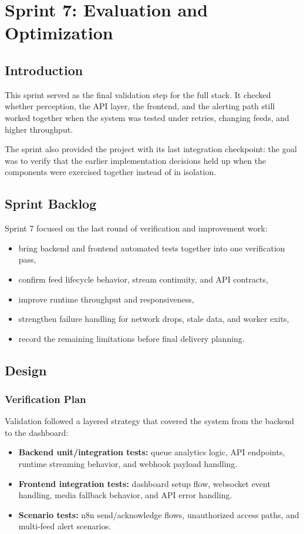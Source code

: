 \chapter{Sprint 7: Evaluation and Optimization}
\chaptertoc

\clearpage

\section{Introduction}
This sprint served as the final validation step for the full stack. It checked whether perception, the API layer, the frontend, and the alerting path still worked together when the system was tested under retries, changing feeds, and higher throughput.

The sprint also provided the project with its last integration checkpoint: the goal was to verify that the earlier implementation decisions held up when the components were exercised together instead of in isolation.

\section{Sprint Backlog}
Sprint 7 focused on the last round of verification and improvement work:
\begin{itemize}
	\item bring backend and frontend automated tests together into one verification pass,
	\item confirm feed lifecycle behavior, stream continuity, and API contracts,
	\item improve runtime throughput and responsiveness,
	\item strengthen failure handling for network drops, stale data, and worker exits,
	\item record the remaining limitations before final delivery planning.
\end{itemize}

\section{Design}

\subsection{Verification Plan}
Validation followed a layered strategy that covered the system from the backend to the dashboard:
\begin{itemize}
	\item \textbf{Backend unit/integration tests:} queue analytics logic, API endpoints, runtime streaming behavior, and webhook payload handling.
	\item \textbf{Frontend integration tests:} dashboard setup flow, websocket event handling, media fallback behavior, and API error handling.
	\item \textbf{Scenario tests:} n8n send/acknowledge flows, unauthorized access paths, and multi-feed alert scenarios.
\end{itemize}

